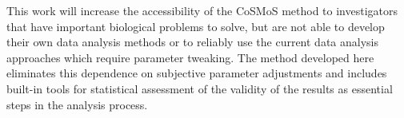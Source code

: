 This work will increase the accessibility of the CoSMoS method to investigators that have important biological problems to solve, but are not able to develop their own data analysis methods or to reliably use the current data analysis approaches which require parameter tweaking. The method developed here eliminates this dependence on subjective parameter adjustments and includes built-in tools for statistical assessment of the validity of the results as essential steps in the analysis process.